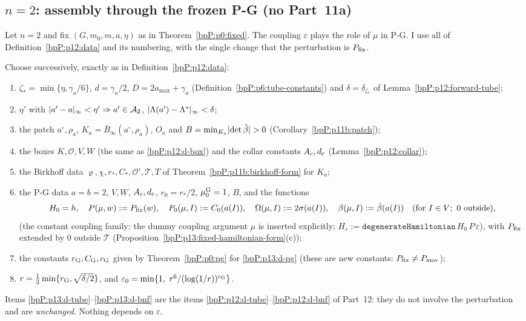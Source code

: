 \subsection{$n=2$: assembly through the frozen P-G (no Part~11a)}\label{bpP:p13:sec-n2}

Let $n=2$ and fix $(G,m_0,m,a,\eta)$ as in Theorem~\ref{bpP:p0:fixed}. The coupling $\varepsilon$ plays the role of $\mu$ in P-G. I use all of Definition~\ref{bpP:p12:data} and its numbering, with the single change that the perturbation is $P_{\rm fix}$.

\begin{definition}\label{bpP:p13:data}
Choose successively, exactly as in Definition~\ref{bpP:p12:data}:
\begin{enumerate}[label=(D\arabic*)]
\item\label{bpP:p13:d-tube} $\zeta_*=\min\{\eta,\gamma_a/6\}$, $d=\gamma_a/2$, $D=2a_{\max}+\gamma_a$ (Definition~\ref{bpP:p6:tube-constants}) and $\delta=\delta_{\zeta_*}$ of Lemma~\ref{bpP:p12:forward-tube};
\item\label{bpP:p13:d-eta} $\eta'$ with $\lvert a'-a\rvert_\infty<\eta'\Rightarrow a'\in\mathcal A_2$, $\lvert \Lambda(a')-\Lambda^*\rvert_\infty<\delta$;
\item\label{bpP:p13:d-patch} the patch $a^\circ,\rho_a$, $K_a=\overline B_\infty(a^\circ,\rho_a)$, $O_a$ and $B=\min_{K_a}\lvert \det\hat\beta\rvert>0$ (Corollary~\ref{bpP:p11b:patch});
\item\label{bpP:p13:d-box} the boxes $K,\mathcal O,V,W$ (the same as \ref{bpP:p12:d-box}) and the collar constants $A_c,d_{\rm c}$ (Lemma~\ref{bpP:p12:collar});
\item\label{bpP:p13:d-bnf} the Birkhoff data $\varrho,\chi,r_*,C_*,\mathcal O',\mathcal T,T$ of Theorem~\ref{bpP:p11b:birkhoff-form} for $K_a$;
\item\label{bpP:p13:d-pg} the P-G data $a=b=2$, $V,W$, $A_c,d_{\rm c}$, $r_0=r_*/2$, $\mu_0^{\rm G}=1$, $B$, and the functions
\[H_0=h,\quad P(\mu,w):=P_{\rm fix}(w),\quad P_0(\mu,I):=C_0(a(I)),\quad \Omega(\mu,I):=2\sigma(a(I)),\quad\beta(\mu,I):=\hat\beta(a(I))\quad(\text{for }I\in V;\ 0\text{ outside}),\]
(the constant coupling family: the dummy coupling argument $\mu$ is inserted explicitly; $H_\varepsilon:=\texttt{degenerateHamiltonian}\,H_0\,P\,\varepsilon$),
with $P_{\rm fix}$ extended by $0$ outside $\mathcal T$ (Proposition~\ref{bpP:p13:fixed-hamiltonian-form}(c));
\item\label{bpP:p13:d-G} the constants $r_{\rm G},C_{\rm G},c_{\rm G}$ given by Theorem~\ref{bpP:p0:pg} for \ref{bpP:p13:d-pg} (these are new constants: $P_{\rm fix}\ne P_{\rm mov}$);
\item\label{bpP:p13:d-r} $r=\tfrac12\min\{r_{\rm G},\sqrt{\delta/2}\}$, and $\varepsilon_0=\min\{1,\ r^6/(\log(1/r))^{c_{\rm G}}\}$.
\end{enumerate}
Items \ref{bpP:p13:d-tube}--\ref{bpP:p13:d-bnf} are the items \ref{bpP:p12:d-tube}--\ref{bpP:p12:d-bnf} of Part~12: they do not involve the perturbation and are \emph{unchanged}. Nothing depends on $\varepsilon$.
\end{definition}

